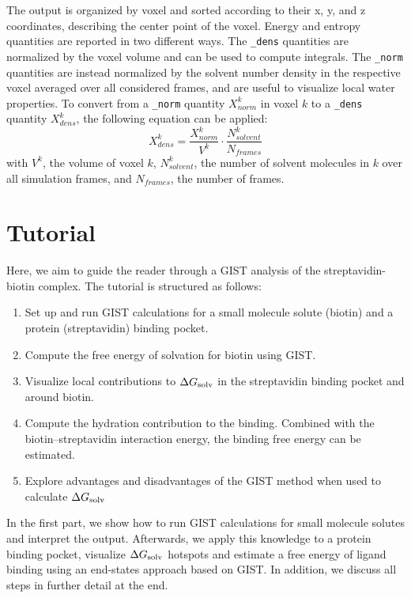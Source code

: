 \documentclass[9pt,tutorial]{livecoms}
\newcommand{\dgsolv}{\Delta G_\textup{solv}}
\newcommand\inlinecode{\texttt}
\begin{document}
The output is organized by voxel and sorted according to their x, y, and z coordinates, describing the center point of the voxel.
Energy and entropy quantities are reported in two different ways.
The \inlinecode{\_dens} quantities are normalized by the voxel volume and can be used to compute integrals.
The \inlinecode{\_norm} quantities are instead normalized by the solvent number density in the respective voxel averaged over all considered frames, and are useful to visualize local water properties.
To convert from a \inlinecode{\_norm} quantity $X^k_{norm}$ in voxel $k$ to a \inlinecode{\_dens} quantity $X^k_{dens}$, the following equation can be applied:
\begin{equation}
	X^k_{dens} = \frac{X^k_{norm}}{V^k} \cdot \frac{N^k_{solvent}}{N_{frames}}
\end{equation}
with $V^k$, the volume of voxel $k$, $N^k_{solvent}$, the number of solvent molecules in $k$ over all simulation frames, and $N_{frames}$, the number of frames.

\section{Tutorial}
Here, we aim to guide the reader through a GIST analysis of the streptavidin-biotin complex.
The tutorial is structured as follows:
\begin{enumerate}
	\item Set up and run GIST calculations for a small molecule solute (biotin) and a protein (streptavidin) binding pocket.
	\item Compute the free energy of solvation for biotin using GIST.
	\item Visualize local contributions to $\dgsolv$ in the streptavidin binding pocket and around biotin.
	\item Compute the hydration contribution to the binding. Combined with the biotin--streptavidin interaction energy, the binding free energy can be estimated.
	\item Explore advantages and disadvantages of the GIST method when used to calculate  $\dgsolv$
\end{enumerate}

In the first part, we show how to run GIST calculations for small molecule solutes and interpret the output.
Afterwards, we apply this knowledge to a protein binding pocket, visualize $\dgsolv$ hotspots and estimate a free energy of ligand binding using an end-states approach based on GIST. In addition, we discuss all steps in further detail at the end. 
\end{document}
